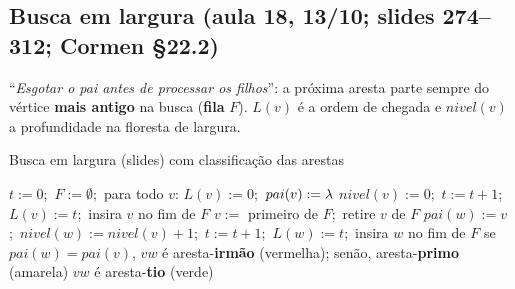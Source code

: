 \subsection{Busca em largura (aula 18, 13/10; slides 274--312; Cormen §22.2)}\label{sec:bfs}
``\emph{Esgotar o pai antes de processar os filhos}'': a próxima aresta parte sempre do vértice \textbf{mais antigo} na busca (\textbf{fila} $F$). $L(v)$ é a ordem de chegada e $nivel(v)$ a profundidade na floresta de largura.
\begin{pseudo}{Busca em largura (slides) com classificação das arestas}
\begin{algorithmic}
  \State $t:=0$;\ $F:=\emptyset$;\ para todo $v$: $L(v):=0$;\ $pai(v):=\lambda$
    \State $nivel(v):=0$;\ $t:=t+1$;\ $L(v):=t$;\ insira $v$ no fim de $F$
      \State $v:=$ primeiro de $F$;\ retire $v$ de $F$
         
          \State $pai(w):=v$;\ $nivel(w):=nivel(v)+1$;\ $t:=t+1$;\ $L(w):=t$;\ insira $w$ no fim de $F$
         
          \State se $pai(w)=pai(v)$, $vw$ é aresta-\textbf{irmão} (vermelha); senão, aresta-\textbf{primo} (amarela)
         \State $vw$ é aresta-\textbf{tio} (verde)
        \EndIf
      \EndFor
    \EndWhile
  \EndWhile
\EndProcedure
\end{algorithmic}
\end{pseudo}

